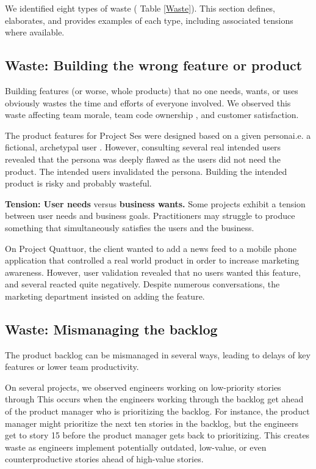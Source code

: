 We identified eight types of waste ( Table \ref{Waste}). This section defines, elaborates, and provides examples of each type, including associated tensions where available.
\subsection{Waste: Building the wrong feature or product}
Building features (or worse, whole products) that no one needs, wants, or uses obviously wastes the time and efforts of everyone involved. We observed this waste affecting team morale, team code ownership \cite{SedanoTeamCodeOwnership}, and customer satisfaction. 

The product features for Project Ses were designed based on a given persona\textemdash i.e. a fictional, archetypal user \cite{Grudin2002personas}. However, consulting several real intended users revealed that the persona was deeply flawed as the users did not need the product. The intended users invalidated the persona. Building the intended product is risky and probably wasteful. 

\textbf{Tension: User needs} versus \textbf{business wants.}
Some projects exhibit a tension between user needs and business goals. Practitioners may struggle to produce something that simultaneously satisfies the users and the business.

On Project Quattuor, the client wanted to add a news feed to a mobile phone application that controlled a real world product in order to increase marketing awareness. However, user validation revealed that no users wanted this feature, and several reacted quite negatively. Despite numerous conversations, the marketing department insisted on adding the feature. 
\subsection{Waste: Mismanaging the backlog}
The product backlog can be mismanaged in several ways, leading to delays of key features or lower team productivity. 

On several projects, we observed engineers working on low-priority stories through  This occurs when the engineers working through the backlog get ahead of the product manager who is prioritizing the backlog. For instance, the product manager might prioritize the next ten stories in the backlog, but the engineers get to story 15 before the product manager gets back to prioritizing. This creates waste as engineers implement potentially outdated, low-value, or even counterproductive stories ahead of high-value stories.   

